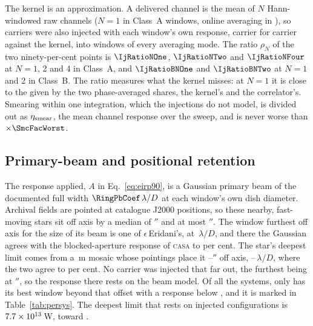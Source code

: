 The kernel is an approximation. A delivered channel is the mean of $N$
Hann-windowed raw channels ($N=1$ in \SvNWinNOne{} Class~A windows, online
averaging in \SvNWinNAvg), so carriers were also injected with each window's
own response, carrier for carrier against the kernel, into \IjNWin{} windows
of every averaging mode. The ratio $\rho_N$ of the two ninety-per-cent points
is $\IjRatioNOne$, $\IjRatioNTwo$ and $\IjRatioNFour$ at $N=1$, 2 and 4 in
Class~A, and $\IjRatioBNOne$ and $\IjRatioBNTwo$ at $N=1$ and 2 in Class~B. The ratio measures what the kernel misses: at $N=1$ it is close
to the \NtKerToExact{} given by the two phase-averaged shares, the kernel's and the
correlator's.
Smearing within one integration, which the injections do not model, is
divided out as $\eta_{\rm smear}$, the mean channel response over the sweep,
and is never worse than $\times\SmcFacWorst$.

\subsection{Primary-beam and positional retention}
\label{app:pbresp}

The response applied, $A$ in Eq.~\ref{eq:eirp90}, is a Gaussian primary beam
of the documented full width $\RingPbCoef\,\lambda/D$ \citep{ALMAHandbook}
at each window's own dish diameter. Archival fields are pointed at catalogue
J2000 positions, so these nearby, fast-moving stars sit off axis by a median
of \PbOffMed$''$ and at most \BmOffMax$''$. The window furthest off axis for the size of its beam is one
of $\epsilon$\,Eridani's, at \BmCensusWorstC\,$\lambda/D$, and there the
Gaussian agrees with the blocked-aperture response of \textsc{casa}
\citep{CASA2022} to \BmCensusWorstPct{} per cent. The star's deepest limit
comes from a \EdDeepDish\,m mosaic whose pointings place it
\EdDeepOffLo--\EdDeepOffHi$''$ off axis, \EdDeepCLo--\EdDeepCHi\,$\lambda/D$,
where the two agree to \EdDeepAgreePct{} per cent. No carrier was injected
that far out, the furthest being at \OffInjMaxArcsec$''$, so the response there
rests on the beam model. Of all the systems, only \OffNames{} has its best
window beyond that offset with a response below \OffAcut, and it is marked
\OffMark{} in Table~\ref{tab:persys}. The deepest limit that rests on
injected configurations is $7.7\times10^{13}$\,W, toward \PtDeepInjStar.

